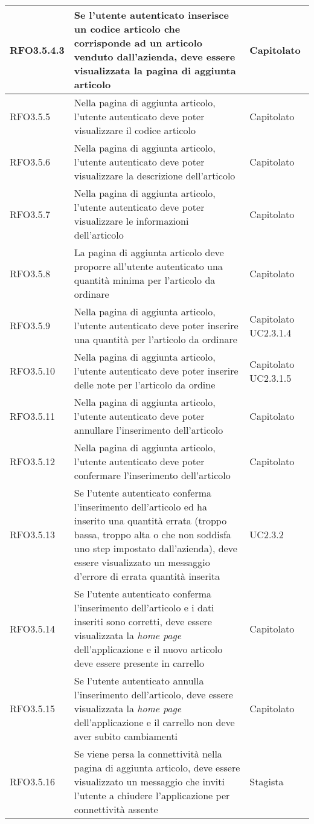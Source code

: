 {\begin{center}
\begin{longtable}{ | >{\centering\arraybackslash}p{2.5cm} | >{\arraybackslash}p{7cm} | >{\centering\arraybackslash}p{2cm} | }
RFO3.5.4.3 & Se l'utente autenticato inserisce un codice articolo che corrisponde ad un articolo venduto dall'azienda, deve essere visualizzata la pagina di aggiunta articolo & Capitolato \\ \hline
RFO3.5.5 & Nella pagina di aggiunta articolo, l'utente autenticato deve poter visualizzare il codice articolo & Capitolato \\ \hline
RFO3.5.6 & Nella pagina di aggiunta articolo, l'utente autenticato deve poter visualizzare la descrizione dell'articolo & Capitolato \\ \hline
RFO3.5.7 & Nella pagina di aggiunta articolo, l'utente autenticato deve poter visualizzare le informazioni dell'articolo & Capitolato \\ \hline
RFO3.5.8 & La pagina di aggiunta articolo deve proporre all'utente autenticato una quantità minima per l'articolo da ordinare & Capitolato \\ \hline
RFO3.5.9 & Nella pagina di aggiunta articolo, l'utente autenticato deve poter inserire una quantità per l'articolo da ordinare & Capitolato UC2.3.1.4 \\ \hline
RFO3.5.10 & Nella pagina di aggiunta articolo, l'utente autenticato deve poter inserire delle note per l'articolo da ordine & Capitolato UC2.3.1.5\\ \hline
RFO3.5.11 & Nella pagina di aggiunta articolo, l'utente autenticato deve poter annullare l'inserimento dell'articolo & Capitolato \\ \hline
RFO3.5.12 & Nella pagina di aggiunta articolo, l'utente autenticato deve poter confermare l'inserimento dell'articolo & Capitolato \\ \hline
RFO3.5.13 & Se l'utente autenticato conferma l'inserimento dell'articolo ed ha inserito una quantità errata (troppo bassa, troppo alta o che non soddisfa uno step impostato dall'azienda), deve essere visualizzato un messaggio d'errore di errata quantità inserita & UC2.3.2 \\ \hline
RFO3.5.14 & Se l'utente autenticato conferma l'inserimento dell'articolo e i dati inseriti sono corretti, deve essere visualizzata la \textit{home page} dell'applicazione e il nuovo articolo deve essere presente in carrello & Capitolato \\ \hline
RFO3.5.15 & Se l'utente autenticato annulla l'inserimento dell'articolo, deve essere visualizzata la \textit{home page} dell'applicazione e il carrello non deve aver subito cambiamenti & Capitolato \\ \hline
RFO3.5.16 & Se viene persa la connettività nella pagina di aggiunta articolo, deve essere visualizzato un messaggio che inviti l'utente a chiudere l'applicazione per connettività assente & Stagista \\ \hline

\end{longtable}
\end{center}}
